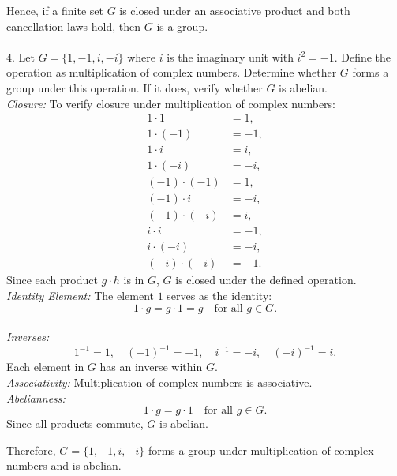 Hence, if a finite set \( G \) is closed under an associative product and both cancellation laws hold, then \( G \) is a group.
\\
\\
4. Let \( G = \{ 1, -1, i, -i \} \) where \( i \) is the imaginary unit with \( i^2 = -1 \). Define the operation as multiplication of complex numbers. Determine whether \( G \) forms a group under this operation. If it does, verify whether \( G \) is abelian.
\\
\textit{Closure:}
To verify closure under multiplication of complex numbers:
\begin{align*}
    1 \cdot 1 &= 1, \\
    1 \cdot (-1) &= -1, \\
    1 \cdot i &= i, \\
    1 \cdot (-i) &= -i, \\
    (-1) \cdot (-1) &= 1, \\
    (-1) \cdot i &= -i, \\
    (-1) \cdot (-i) &= i, \\
    i \cdot i &= -1, \\
    i \cdot (-i) &= -i, \\
    (-i) \cdot (-i) &= -1.
\end{align*}
Since each product \( g \cdot h \) is in \( G \), \( G \) is closed under the defined operation.
\\
\textit{Identity Element:}
The element \( 1 \) serves as the identity:
\[ 1 \cdot g = g \cdot 1 = g \quad \text{for all } g \in G. \]
\\
\textit{Inverses:}
\[ 1^{-1} = 1, \quad (-1)^{-1} = -1, \quad i^{-1} = -i, \quad (-i)^{-1} = i. \]
Each element in \( G \) has an inverse within \( G \).
\\
\textit{Associativity:}
Multiplication of complex numbers is associative.
\\
\textit{Abelianness:}
\[ 1 \cdot g = g \cdot 1 \quad \text{for all } g \in G. \]
Since all products commute, \( G \) is abelian.

Therefore, \( G = \{ 1, -1, i, -i \} \) forms a group under multiplication of complex numbers and is abelian.

